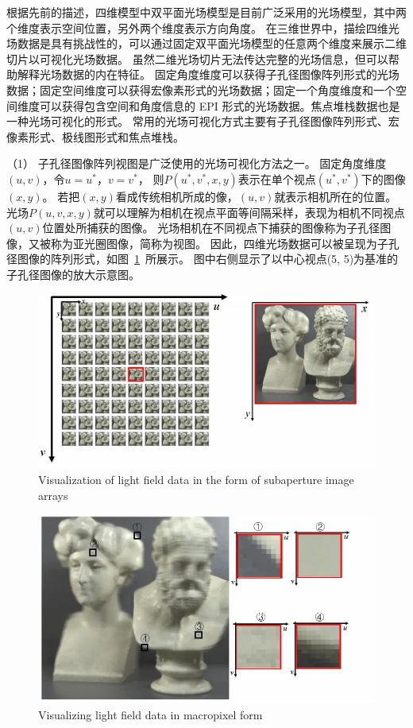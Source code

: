
根据先前的描述，四维模型中双平面光场模型是目前广泛采用的光场模型，其中两个维度表示空间位置，另外两个维度表示方向角度。
在三维世界中，描绘四维光场数据是具有挑战性的，可以通过固定双平面光场模型的任意两个维度来展示二维切片以可视化光场数据。
虽然二维光场切片无法传达完整的光场信息，但可以帮助解释光场数据的内在特征。
固定角度维度可以获得子孔径图像阵列形式的光场数据；固定空间维度可以获得宏像素形式的光场数据；固定一个角度维度和一个空间维度可以获得包含空间和角度信息的 EPI 形式的光场数据。焦点堆栈数据也是一种光场可视化的形式。
常用的光场可视化方式主要有子孔径图像阵列形式、宏像素形式、极线图形式和焦点堆栈。
\par
%
%
%
（1）
子孔径图像阵列视图是广泛使用的光场可视化方法之一。
固定角度维度$(u, v)$，令$u = u^{*}$，$ v = v^{*} $，
则$P(u^{*}, v^{*}, x, y) $表示在单个视点$(u^{*}, v^{*})$下的图像$(x,y)$。
若把$(x,y)$看成传统相机所成的像，$(u, v)$就表示相机所在的位置。
光场$P(u, v, x, y)$就可以理解为相机在视点平面等间隔采样，表现为相机不同视点$(u, v)$位置处所捕获的图像。
光场相机在不同视点下捕获的图像称为子孔径图像，又被称为亚光圈图像，简称为视图。
因此，四维光场数据可以被呈现为子孔径图像的阵列形式，如图~\ref{chapter2_fig5:multi_photo}~所展示。
图中右侧显示了以中心视点(5, 5)为基准的子孔径图像的放大示意图。\par
%
%
\begin{figure}[!ht]
	\centering
	\includegraphics[width=0.75\linewidth]{figures/chapter2/multi_photo}
	{Visualization of light field data in the form of subaperture image arrays}  
	\label{chapter2_fig5:multi_photo}
\end{figure}
%
%
%
%
\begin{figure}[!ht]
	\centering
	\includegraphics[width=0.80\linewidth]{figures/chapter2/macro_photo}
	{Visualizing light field data in macropixel form}  
	\label{cpt2_fig5:macro_photo}
\end{figure}
